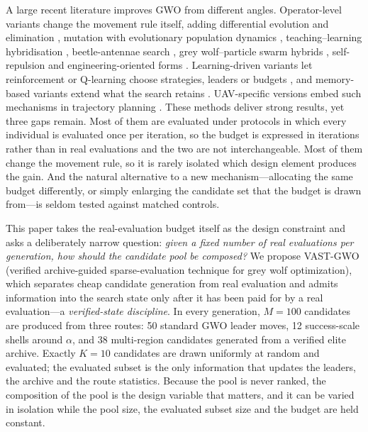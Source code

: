 \documentclass[11pt,a4paper]{article}
\newcommand{\method}{VAST-GWO}
\begin{document}
A large recent literature improves GWO from different angles. Operator-level
variants change the movement rule itself, adding differential evolution and
elimination \citep{wang2019igwode}, mutation with evolutionary population
dynamics \citep{zhang2025mutation}, teaching--learning hybridisation
\citep{singh2025tlbo}, beetle-antennae search \citep{zhang2025bagwo}, grey
wolf--particle swarm hybrids \citep{shaikh2025hybrid}, self-repulsion
\citep{wang2025selfrepulsion} and engineering-oriented forms
\citep{nadimi2021igwo,li2021sustainability}. Learning-driven variants let
reinforcement or Q-learning choose strategies, leaders or budgets
\citep{yin2026amsgwo,huang2026qlfdgwo,khalid2026aogwo,wang2026dmsgwo}, and
memory-based variants extend what the search retains
\citep{zamani2026egwo,tejani2025twoarchive}. UAV-specific versions embed such
mechanisms in trajectory planning \citep{nayeem2025drones,jia2025drones}. These
methods deliver strong results, yet three gaps remain. Most of them are
evaluated under protocols in which every individual is evaluated once per
iteration, so the budget is expressed in iterations rather than in real
evaluations and the two are not interchangeable. Most of them change the
movement rule, so it is rarely isolated which design element produces the gain.
And the natural alternative to a new mechanism---allocating the same budget
differently, or simply enlarging the candidate set that the budget is drawn
from---is seldom tested against matched controls.

This paper takes the real-evaluation budget itself as the design constraint and
asks a deliberately narrow question: \emph{given a fixed number of real
evaluations per generation, how should the candidate pool be composed?} We
propose \method{} (verified archive-guided sparse-evaluation technique for grey
wolf optimization), which separates cheap candidate generation from real
evaluation and admits information into the search state only after it has been
paid for by a real evaluation---a \emph{verified-state discipline}. In every
generation, $M=100$ candidates are produced from three routes: 50 standard GWO
leader moves, 12 success-scale shells around $\alpha$, and 38 multi-region
candidates generated from a verified elite archive. Exactly $K=10$ candidates
are drawn uniformly at random and evaluated; the evaluated subset is the only
information that updates the leaders, the archive and the route statistics.
Because the pool is never ranked, the composition of the pool is the design
variable that matters, and it can be varied in isolation while the pool size,
the evaluated subset size and the budget are held constant.
\end{document}
